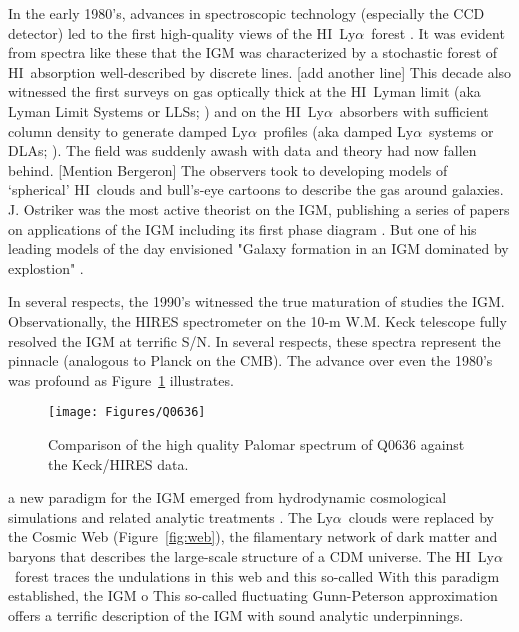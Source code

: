 \documentclass[graybox]{svmult}
\newcommand{\HI}{H{\sc I}}
\def\lya{Ly$\alpha$}
\begin{document}
In the early 1980's, advances in spectroscopic technology
(especially the CCD detector) led to the first high-quality
views of the \HI\ \lya\ forest 
\cite[Figure~\ref{fig:young}]{young79,boks78,sargent80}.
It was evident from spectra like these that the IGM was
characterized by a stochastic forest of \HI\ absorption
well-described by discrete lines.  [add another line]
This decade also witnessed the first surveys on gas
optically thick at the \HI\ Lyman limit (aka Lyman Limit Systems 
or LLSs; \cite{tytler82})
and on the \HI\ \lya\ absorbers with sufficient column
density to generate damped \lya\ profiles
(aka damped \lya\ systems or DLAs; \cite{wolfe86}).
The field was suddenly awash with data and theory had
now fallen behind.
[Mention Bergeron]
The observers took to developing models of 
`spherical' \HI\ clouds and bull's-eye cartoons to 
describe the gas around galaxies.  
J. Ostriker was the most active theorist on the IGM,
publishing a series of papers on applications of the
IGM including its first phase diagram 
\cite{oi83,oh84,bdo88,duncan89}.
But one of his leading models of the day envisioned
"Galaxy formation in an IGM dominated by explostion"
\cite{oc81}.


In several respects, the 1990's witnessed the
true maturation of studies the IGM.  Observationally,
the HIRES spectrometer \cite{vogt94} on the 10-m W.M.
Keck telescope fully resolved the IGM at terrific
S/N.  In several respects, these spectra represent
the pinnacle (analogous to Planck on the CMB).
The advance over even the 1980's was profound
as Figure~\ref{fig:HIRES} illustrates.

%
\begin{figure}[b]
\sidecaption
\texttt{[image: Figures/Q0636]}
%
%
\caption{Comparison of the high quality Palomar spectrum
of Q0636 against the Keck/HIRES data.
}
\label{fig:HIRES}       %
\end{figure}


a new paradigm for the IGM emerged
from hydrodynamic cosmological simulations \cite{mco+96}
and related analytic treatments \cite{HuiGnedin97}.
The \lya\ clouds were replaced by the Cosmic Web (Figure~\ref{fig:web}),
the filamentary network of dark matter and baryons that 
describes the large-scale structure of a CDM universe.
The \HI\ \lya\ forest traces the undulations in this web
and this so-called 
With this paradigm established, the IGM o
This so-called fluctuating Gunn-Peterson approximation
offers a terrific description of the IGM with sound
analytic underpinnings.
\end{document}
